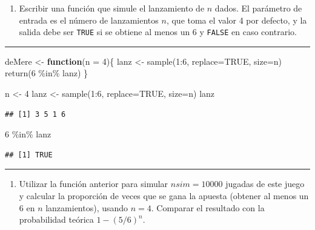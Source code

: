\documentclass[
]{book}
\newenvironment{Shaded}{\begin{snugshade}}{\end{snugshade}}
\newcommand{\AttributeTok}[1]{\textcolor[rgb]{0.77,0.63,0.00}{#1}}
\newcommand{\ConstantTok}[1]{\textcolor[rgb]{0.00,0.00,0.00}{#1}}
\newcommand{\ControlFlowTok}[1]{\textcolor[rgb]{0.13,0.29,0.53}{\textbf{#1}}}
\newcommand{\DecValTok}[1]{\textcolor[rgb]{0.00,0.00,0.81}{#1}}
\newcommand{\FunctionTok}[1]{\textcolor[rgb]{0.00,0.00,0.00}{#1}}
\newcommand{\NormalTok}[1]{#1}
\newcommand{\OtherTok}[1]{\textcolor[rgb]{0.56,0.35,0.01}{#1}}
\newcommand{\SpecialCharTok}[1]{\textcolor[rgb]{0.00,0.00,0.00}{#1}}
\providecommand{\tightlist}{%
  \setlength{\itemsep}{0pt}\setlength{\parskip}{0pt}}
\theoremstyle{break}
\theoremstyle{nonumberplain}
\begin{document}
\begin{enumerate}
\def\labelenumi{\alph{enumi})}
\tightlist
\item
  Escribir una función que simule el lanzamiento de \(n\) dados. El
  parámetro de entrada es el número de lanzamientos \(n\), que toma
  el valor 4 por defecto, y la salida debe ser \texttt{TRUE} si se
  obtiene al menos un 6 y \texttt{FALSE} en caso contrario.
\end{enumerate}

\begin{center}\rule{0.5\linewidth}{0.5pt}\end{center}

\begin{Shaded}
\begin{Highlighting}[]
\NormalTok{deMere }\OtherTok{\textless{}{-}} \ControlFlowTok{function}\NormalTok{(}\AttributeTok{n =} \DecValTok{4}\NormalTok{)\{}
\NormalTok{  lanz }\OtherTok{\textless{}{-}} \FunctionTok{sample}\NormalTok{(}\DecValTok{1}\SpecialCharTok{:}\DecValTok{6}\NormalTok{, }\AttributeTok{replace=}\ConstantTok{TRUE}\NormalTok{, }\AttributeTok{size=}\NormalTok{n)}
  \FunctionTok{return}\NormalTok{(}\DecValTok{6} \SpecialCharTok{\%in\%}\NormalTok{ lanz)}
\NormalTok{\}}

\NormalTok{n }\OtherTok{\textless{}{-}} \DecValTok{4}
\NormalTok{lanz }\OtherTok{\textless{}{-}} \FunctionTok{sample}\NormalTok{(}\DecValTok{1}\SpecialCharTok{:}\DecValTok{6}\NormalTok{, }\AttributeTok{replace=}\ConstantTok{TRUE}\NormalTok{, }\AttributeTok{size=}\NormalTok{n)}
\NormalTok{lanz}
\end{Highlighting}
\end{Shaded}

\begin{verbatim}
## [1] 3 5 1 6
\end{verbatim}

\begin{Shaded}
\begin{Highlighting}[]
\DecValTok{6} \SpecialCharTok{\%in\%}\NormalTok{ lanz}
\end{Highlighting}
\end{Shaded}

\begin{verbatim}
## [1] TRUE
\end{verbatim}

\begin{center}\rule{0.5\linewidth}{0.5pt}\end{center}

\begin{enumerate}
\def\labelenumi{\alph{enumi})}
\setcounter{enumi}{1}
\tightlist
\item
  Utilizar la función anterior para simular \(nsim=10000\) jugadas
  de este juego y calcular la proporción de veces que se gana la
  apuesta (obtener al menos un 6 en \(n\) lanzamientos), usando
  \(n=4\). Comparar el resultado con la probabilidad teórica
  \(1-(5/6)^{n}\).
\end{enumerate}
\end{document}
